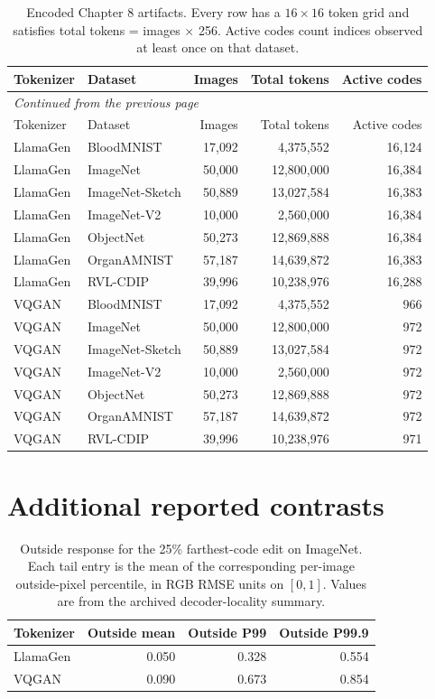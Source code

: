 \begingroup
\small
\setlength{\tabcolsep}{4pt}
\begin{longtable}{llrrr}
\caption[Encoded Chapter 8 artifacts]{Encoded Chapter 8 artifacts. Every row has a $16\times16$ token grid and satisfies total tokens = images $\times$ 256. Active codes count indices observed at least once on that dataset.}\label{tab:app_shift_inventory}\\
\hline
Tokenizer & Dataset & Images & Total tokens & Active codes \\ \hline
\endfirsthead
\multicolumn{5}{l}{\small\itshape Continued from the previous page}\\
\hline
Tokenizer & Dataset & Images & Total tokens & Active codes \\ \hline
\endhead
\hline
\endfoot
LlamaGen & BloodMNIST & 17{,}092 & 4{,}375{,}552 & 16{,}124 \\
LlamaGen & ImageNet & 50{,}000 & 12{,}800{,}000 & 16{,}384 \\
LlamaGen & ImageNet-Sketch & 50{,}889 & 13{,}027{,}584 & 16{,}383 \\
LlamaGen & ImageNet-V2 & 10{,}000 & 2{,}560{,}000 & 16{,}384 \\
LlamaGen & ObjectNet & 50{,}273 & 12{,}869{,}888 & 16{,}384 \\
LlamaGen & OrganAMNIST & 57{,}187 & 14{,}639{,}872 & 16{,}383 \\
LlamaGen & RVL-CDIP & 39{,}996 & 10{,}238{,}976 & 16{,}288 \\
VQGAN & BloodMNIST & 17{,}092 & 4{,}375{,}552 & 966 \\
VQGAN & ImageNet & 50{,}000 & 12{,}800{,}000 & 972 \\
VQGAN & ImageNet-Sketch & 50{,}889 & 13{,}027{,}584 & 972 \\
VQGAN & ImageNet-V2 & 10{,}000 & 2{,}560{,}000 & 972 \\
VQGAN & ObjectNet & 50{,}273 & 12{,}869{,}888 & 972 \\
VQGAN & OrganAMNIST & 57{,}187 & 14{,}639{,}872 & 972 \\
VQGAN & RVL-CDIP & 39{,}996 & 10{,}238{,}976 & 971 \\
\end{longtable}
\endgroup

\section{Additional reported contrasts}
\begin{table}[htbp]
\centering
\begin{tabular}{lrrr}
Tokenizer & Outside mean & Outside P99 & Outside P99.9 \\ \hline
LlamaGen & 0.050 & 0.328 & 0.554 \\
VQGAN & 0.090 & 0.673 & 0.854 \\
\end{tabular}
\caption{Outside response for the 25\% farthest-code edit on ImageNet.
Each tail entry is the mean of the corresponding per-image outside-pixel
percentile, in RGB RMSE units on $[0,1]$. Values are from the archived
decoder-locality summary.}
\label{tab:app_decoder_tail_check}
\end{table}

